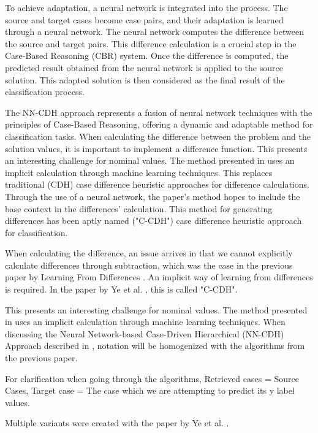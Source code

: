 \documentclass[a4paper, 12pt]{report}
\begin{document}
To achieve adaptation, a neural network is integrated into the process. The source and target cases become case pairs, and their adaptation is learned through a neural network. 
The neural network computes the difference between the source and target pairs. 
This difference calculation is a crucial step in the Case-Based Reasoning (CBR) system. Once the difference is computed, the predicted result obtained from the neural network is applied to the source solution. 
This adapted solution is then considered as the final result of the classification process.

The NN-CDH approach represents a fusion of neural network techniques with the principles of Case-Based Reasoning, offering a dynamic and adaptable method for classification tasks. 
When calculating the difference between the problem and the solution values, it is important to implement a difference function. This presents an interesting challenge for nominal values. 
The method presented in \cite{ye2021learning} uses an implicit calculation through machine learning techniques. This replaces traditional (CDH) case difference heuristic approaches for difference calculations. 
Through the use of a neural network, the paper's method hopes to include the base context in the differences' calculation. This method for generating differences has been aptly named ("C-CDH") case difference heuristic approach for classification.

When calculating the difference, an issue arrives in that we cannot explicitly calculate differences through subtraction, which was the case in the previous paper by Learning From Differences \cite{learningFromDifferences2022}. 
An implicit way of learning from differences is required. In the paper by Ye et al. \cite{ye2021learning}, this is called "C-CDH".

This presents an interesting challenge for nominal values. The method presented in \cite{ye2021learning} uses an implicit calculation through machine learning techniques. 
When discussing the Neural Network-based Case-Driven Hierarchical (NN-CDH) Approach described in \cite{ye2021learning}, notation will be homogenized with the algorithms from the previous paper.

For clarification when going through the algorithms, Retrieved cases = Source Cases, Target case = The case which we are attempting to predict its y label values.

Multiple variants were created with the paper by Ye et al. \cite{ye2021learning}.
\end{document}

